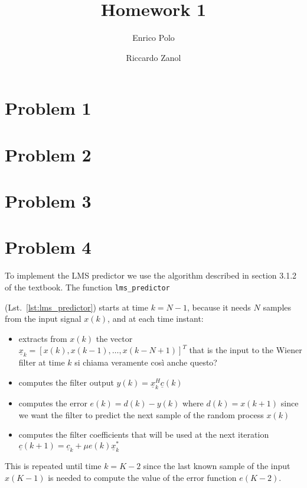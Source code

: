 \documentclass{article}
\author{Enrico Polo \and Riccardo Zanol}
\title{Homework 1}
\newcommand{\inlinecode}[1]{
  \lstinline[basicstyle=\ttfamily,keywordstyle={}]{#1}
}
\renewcommand{\vec}[1]{
  \underline{#1}
}
\begin{document}
\maketitle
\section*{Problem 1}
\section*{Problem 2}
\section*{Problem 3}
\section*{Problem 4}
To implement the LMS predictor we use the algorithm described in
section 3.1.2 of the textbook. The function \inlinecode{lms_predictor}
(Lst.~\ref{lst:lms_predictor}) starts at time $k=N-1$, because it
needs $N$ samples from the input signal $x(k)$, and at each
time instant:
\begin{itemize}
  \item extracts from $x(k)$ the vector $\vec{x}_k = [x(k),
    x(k-1),\dots,x(k-N+1)]^T$ that is the input to the Wiener filter
    at time $k$ {\color{red} si chiama veramente così anche questo?}
  \item computes the filter output $y(k) = \vec{x}_k^H\vec{c}(k)$
  \item computes the error $e(k) = d(k) - y(k)$ where $d(k) = x(k+1)$
    since we want the filter to predict the next sample of the random
    process $x(k)$
  \item computes the filter coefficients that will be used at the next
    iteration $\vec{c}(k+1) = \vec{c}_k + \mu e(k) \vec{x}_k^*$
\end{itemize}
This is repeated until time $k = K - 2$ since the last known sample of
the input $x(K-1)$ is needed to compute the value of the error
function $e(K-2)$.
\end{document}
